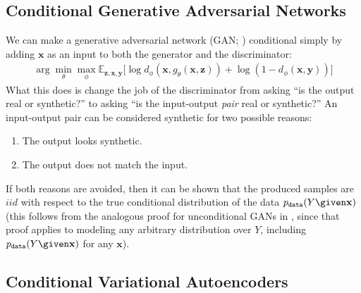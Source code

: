 \subsection{Conditional Generative Adversarial Networks} 
We can make a generative adversarial network (GAN; \sect{\ref{sec:generative_models:GANs}}) conditional simply by adding $\mathbf{x}$ as an input to both the generator and the discriminator:
\begin{align}
    \arg\min_{\theta}\max_{\phi} \mathbb{E}_{\mathbf{z},\mathbf{x},\mathbf{y}} \big[ \log d_{\phi}(\mathbf{x}, g_{\theta}(\mathbf{x},\mathbf{z})) + \log (1 - d_{\phi}(\mathbf{x}, \mathbf{y})) \big]
\end{align}
What this does is change the job of the discriminator from asking ``is the output real or synthetic?'' to asking ``is the input-output \textit{pair} real or synthetic?'' An input-output pair can be considered synthetic for two possible reasons:
\begin{enumerate}
    \item The output looks synthetic.
    \item The output does not match the input.
\end{enumerate}
If both reasons are avoided, then it can be shown that the produced samples are $iid$ with respect to the true conditional distribution of the data $p_{\texttt{data}}(Y \given \mathbf{x})$ (this follows from the analogous proof for unconditional GANs in \cite{goodfellow2014generative}, since that proof applies to modeling any arbitrary distribution over $Y$, including $p_{\texttt{data}}(Y \given \mathbf{x})$ for any $\mathbf{x}$).


\subsection{Conditional Variational Autoencoders}\label{sec:conditional_generative_models:cVAE}

